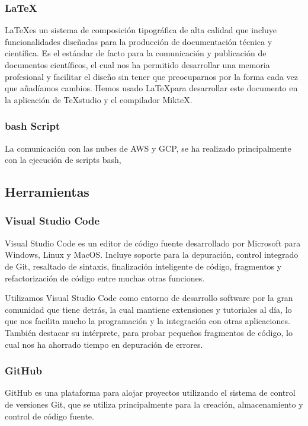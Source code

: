 \subsubsection*{\LaTeX} \label{latexDef}
\LaTeX\space es un sistema de composición tipográfica de alta calidad que incluye funcionalidades diseñadas para la producción de documentación técnica y científica. Es el estándar de facto para la comunicación y publicación de documentos científicos, el cual nos ha permitido desarrollar una memoria profesional y facilitar el diseño sin tener que preocuparnos por la forma cada vez que añadíamos cambios.       
Hemos usado \LaTeX\space para desarrollar este documento en la aplicación de TeXstudio y el compilador MikteX.

\subsubsection*{bash Script}
La comunicación con las nubes de AWS y GCP, se ha realizado principalmente con la ejecución de scripts bash, 

\subsection{Herramientas} 

\subsubsection*{Visual Studio Code}
Visual Studio Code es un editor de código fuente desarrollado por Microsoft para Windows, Linux y MacOS. Incluye soporte para la depuración, control integrado de Git, resaltado de sintaxis, finalización inteligente de código, fragmentos y refactorización de código entre muchas otras funciones. 

Utilizamos Visual Studio Code como entorno de desarrollo software por la gran comunidad que tiene detrás, la cual mantiene extensiones y tutoriales al día, lo que nos facilita mucho la programación y la integración con otras aplicaciones. También destacar su intérprete, para probar pequeños fragmentos de código, lo cual nos ha ahorrado tiempo en depuración de errores.

\subsubsection*{GitHub}
GitHub es una plataforma para alojar proyectos utilizando el sistema de control de versiones Git, que se utiliza principalmente para la creación, almacenamiento y control de código fuente.  

